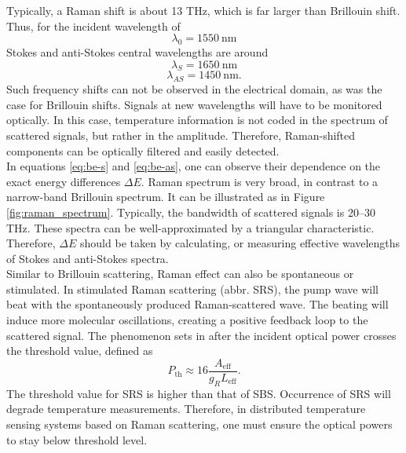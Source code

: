 \documentclass{standalone}
\begin{document}
Typically, a Raman shift is about 13 THz, which is far larger than Brillouin shift. Thus, for the incident wavelength of
\begin{equation}
\lambda_0 = \SI{1550}{\nano \meter}
\end{equation}
Stokes and anti-Stokes central wavelengths are around
\begin{equation}
\lambda_S = \SI{1650}{\nano \meter}
\end{equation}
\begin{equation}
\lambda_{AS} = \SI{1450}{\nano \meter} \textrm{.}
\end{equation}
Such frequency shifts can not be observed in the electrical domain, as was the case for Brillouin shifts. Signals at new wavelengths will have to be monitored optically. In this case, temperature information is not coded in the spectrum of scattered signals, but rather in the amplitude. Therefore, Raman-shifted components can be optically filtered and easily detected. \\

In equations \ref{eq:be-s} and \ref{eq:be-as}, one can observe their dependence on the exact energy differences $\varDelta E$. Raman spectrum is very broad, in contrast to a narrow-band Brillouin spectrum. It can be illustrated as in Figure \ref{fig:raman_spectrum}.
Typically, the bandwidth of scattered signals is 20--30 THz. These spectra can be well-approximated by a triangular characteristic. Therefore, $\varDelta E$ should be taken by calculating, or measuring effective wavelengths of Stokes and anti-Stokes spectra. \\

Similar to Brillouin scattering, Raman effect can also be spontaneous or stimulated. In stimulated Raman scattering (abbr. SRS), the pump wave will beat with the spontaneously produced Raman-scattered wave. The beating will induce more molecular oscillations, creating a positive feedback loop to the scattered signal. The phenomenon sets in after the incident optical power crosses the threshold value, defined as
\begin{equation} \label{eq:raman_threshold}
P_\textrm{th} \approx 16 \frac{A_\textrm{eff}}{g_R L_\textrm{eff}} \textrm{.}
\end{equation}
The threshold value for SRS is higher than that of SBS. Occurrence of SRS will degrade temperature measurements. Therefore, in distributed temperature sensing systems based on Raman scattering, one must ensure the optical powers to stay below threshold level.




\setcounter{stranica}{\thepage}
\addtocounter{stranica}{1}
\end{document}
